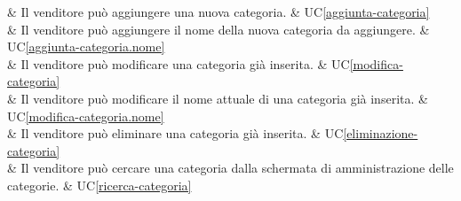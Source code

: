  & Il venditore può aggiungere una nuova categoria. & UC\ref{aggiunta-categoria} \\
    
 & Il venditore può aggiungere il nome della nuova categoria da aggiungere. & UC\ref{aggiunta-categoria.nome} \\
    
 & Il venditore può modificare una categoria già inserita. & UC\ref{modifica-categoria} \\
    
 & Il venditore può modificare il nome attuale di una categoria già inserita. & UC\ref{modifica-categoria.nome} \\
    
 & Il venditore può eliminare una categoria già inserita. & UC\ref{eliminazione-categoria} \\
    
 & Il venditore può cercare una categoria dalla schermata di amministrazione delle categorie. & UC\ref{ricerca-categoria} \\